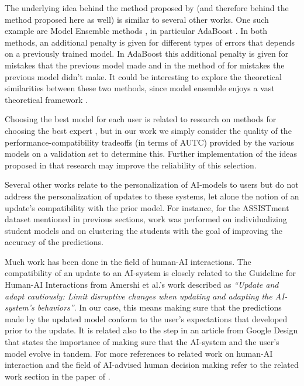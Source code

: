 \documentclass[letterpaper]{article} %
\theoremstyle{definition}
\begin{document}
The underlying idea behind the method proposed by \citet{bansal2019updates} (and therefore behind the method proposed here as well) is similar to several other works. One such example are Model Ensemble methods \cite{opitz1999popular}, in particular AdaBoost \cite{freund1996experiments}. In both methods, an additional penalty is given for different types of errors that depends on a previously trained model. In AdaBoost this additional penalty is given for mistakes that the previous model made and in the method of \citet{bansal2019updates} for mistakes the previous model didn't make.
It could be interesting to explore the theoretical similarities between these two methods, since model ensemble enjoys a vast theoretical framework \cite{freund1996experiments}.

Choosing the best model for each user is related to research on methods for choosing the best expert \cite{herbster1998tracking}, but in our work we simply consider the quality of the performance-compatibility tradeoffs (in terms of AUTC) provided by the various models on a validation set to determine this.
Further implementation of the ideas proposed in that research may improve the reliability of this selection.

Several other works relate to the personalization of AI-models to users but do not address the personalization of updates to these systems, let alone the notion of an update's compatibility with the prior model. For instance, for the ASSISTment dataset mentioned in previous sections, work was performed on individualizing student models  \cite{wang2012student,pardos2010modeling} and on clustering the students \cite{trivedi2011clustering,trivedi2010spectral} with the goal of improving the accuracy of the predictions.

Much work has been done in the field of human-AI interactions. The compatibility of an update to an AI-system is closely related to the  Guideline for Human-AI Interactions from Amershi et al.'s work \cite{amershi2019guidelines} described as \emph{``Update and adapt cautiously: Limit disruptive changes when updating and adapting the
AI-system’s behaviors''}. In our case, this means making sure that the predictions made by the updated model conform to the user's expectations that developed prior to the update. It is related also to the  step in an article from Google Design \cite{lovejoy2017} that states the importance of making sure that the AI-system and the user's model evolve in tandem. For more references to related work on human-AI interaction and the field of AI-advised human decision making refer to the related work section in the paper of \citet{bansal2019updates}.
%
\end{document}
